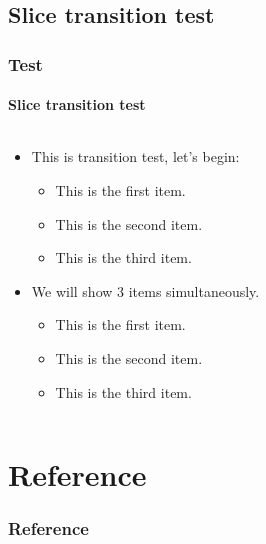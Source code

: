 \documentclass[aspectratio=169]{beamer}
\begin{document}
\subsection{Slice transition test}
\begin{frame}
\frametitle{Test}
\framesubtitle{Slice transition test}
  \label{sec:slicetrans}
  \begin{columns}
    \begin{column}{.48\textwidth}
      \begin{itemize}
        \item<1-> This is transition test, let's begin:
        \begin{itemize}
          \item<2-> This is the first item.
          \item<3-> This is the second item.
          \item<4-> This is the third item.
        \end{itemize}
        \item<5-> We will show 3 items simultaneously.
        \begin{itemize}
          \item<6-> This is the first item.
          \item<6-> This is the second item.
          \item<6-> This is the third item.
        \end{itemize}
      \end{itemize}
    \end{column}
    \begin{column}{.48\textwidth}
    \end{column}
  \end{columns}
\end{frame}

\section{Reference}
%
\begin{frame}[allowframebreaks]
\frametitle{Reference}
\footnotesize


\end{frame}

\ThankYouFrame
\end{document}
